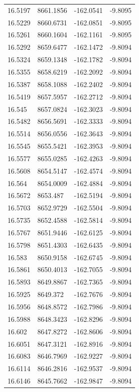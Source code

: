 \begin{table}[H]
\begin{tabular}{llll}
16.5197 & 8661.1856 & -162.0541 & -9.8095 \\
16.5229 & 8660.6731 & -162.0851 & -9.8095 \\
16.5261 & 8660.1604 & -162.1161 & -9.8095 \\
16.5292 & 8659.6477 & -162.1472 & -9.8094 \\
16.5324 & 8659.1348 & -162.1782 & -9.8094 \\
16.5355 & 8658.6219 & -162.2092 & -9.8094 \\
16.5387 & 8658.1088 & -162.2402 & -9.8094 \\
16.5419 & 8657.5957 & -162.2712 & -9.8094 \\
16.545 & 8657.0824 & -162.3023 & -9.8094 \\
16.5482 & 8656.5691 & -162.3333 & -9.8094 \\
16.5514 & 8656.0556 & -162.3643 & -9.8094 \\
16.5545 & 8655.5421 & -162.3953 & -9.8094 \\
16.5577 & 8655.0285 & -162.4263 & -9.8094 \\
16.5608 & 8654.5147 & -162.4574 & -9.8094 \\
16.564 & 8654.0009 & -162.4884 & -9.8094 \\
16.5672 & 8653.487 & -162.5194 & -9.8094 \\
16.5703 & 8652.9729 & -162.5504 & -9.8094 \\
16.5735 & 8652.4588 & -162.5814 & -9.8094 \\
16.5767 & 8651.9446 & -162.6125 & -9.8094 \\
16.5798 & 8651.4303 & -162.6435 & -9.8094 \\
16.583 & 8650.9158 & -162.6745 & -9.8094 \\
16.5861 & 8650.4013 & -162.7055 & -9.8094 \\
16.5893 & 8649.8867 & -162.7365 & -9.8094 \\
16.5925 & 8649.372 & -162.7676 & -9.8094 \\
16.5956 & 8648.8572 & -162.7986 & -9.8094 \\
16.5988 & 8648.3423 & -162.8296 & -9.8094 \\
16.602 & 8647.8272 & -162.8606 & -9.8094 \\
16.6051 & 8647.3121 & -162.8916 & -9.8094 \\
16.6083 & 8646.7969 & -162.9227 & -9.8094 \\
16.6114 & 8646.2816 & -162.9537 & -9.8094 \\
16.6146 & 8645.7662 & -162.9847 & -9.8094 \\

\end{tabular}
\end{table}
